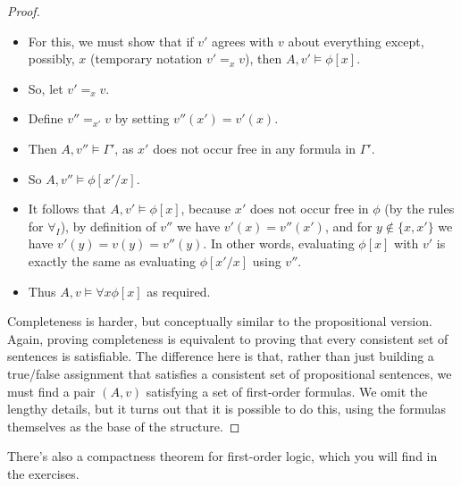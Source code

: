 \documentclass{article}
\theoremstyle{plain}
\begin{document}
\begin{proof}
\begin{itemize}
\begin{itemize}
\item For this, we must show that if $v'$ agrees with $v$ about everything except, possibly, $x$ (temporary notation $v'=_x v$), then $A,v'\models \phi[x]$. 
\item So, let $v' =_x v$.
\item Define $v'' =_{x'} v$ by setting $v''(x') = v'(x)$. 
\item Then $A,v'' \models \Gamma'$, as $x'$ does not occur free in any formula in $\Gamma'$.
\item So $A,v''\models \phi[x'/x]$.
\item It follows that $A,v'\models \phi[x]$, because $x'$ does not occur free in $\phi$ (by the rules for $\forall_I$), by definition of $v''$ we have $v'(x) = v''(x')$, and for $y\notin \{x,x'\}$ we have $v'(y)=v(y)=v''(y)$. In other words, evaluating $\phi[x]$ with $v'$ is exactly the same as evaluating $\phi[x'/x]$ using $v''$.
\item Thus $A,v\models \forall x \phi[x]$ as required.
\end{itemize}
\end{itemize}

Completeness is harder, but conceptually similar to the propositional version. Again, proving completeness is equivalent to proving that every consistent set of sentences is satisfiable. The difference here is that, rather than just building a true/false assignment that satisfies a consistent set of propositional sentences, we must find a pair $(A,v)$ satisfying a set of first-order formulas. We omit the lengthy details, but it turns out that it is possible to do this, using the formulas themselves as the base of the structure. 
\end{proof}


There's also a compactness theorem for first-order logic, which you will find in the exercises.
\end{document}
